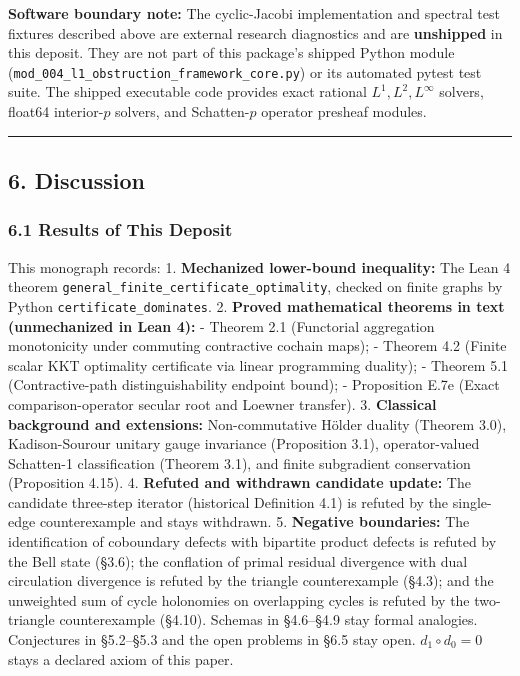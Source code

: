 \documentclass[
]{article}
\begin{document}
\textbf{Software boundary note:} The cyclic-Jacobi implementation and spectral test fixtures described above are external research diagnostics and are \textbf{unshipped} in this deposit. They are not part of this package's shipped Python module (\texttt{mod\_004\_l1\_obstruction\_framework\_core.py}) or its automated pytest test suite. The shipped executable code provides exact rational \(L^1, L^2, L^\infty\) solvers, float64 interior-\(p\) solvers, and Schatten-\(p\) operator presheaf modules.

\begin{center}\rule{0.5\linewidth}{0.5pt}\end{center}

\subsection{6. Discussion}\label{discussion}

\subsubsection{6.1 Results of This Deposit}\label{results-of-this-deposit}

This monograph records:
1. \textbf{Mechanized lower-bound inequality:} The Lean 4 theorem \texttt{general\_finite\_certificate\_optimality}, checked on finite graphs by Python \texttt{certificate\_dominates}.
2. \textbf{Proved mathematical theorems in text (unmechanized in Lean 4):}
- Theorem 2.1 (Functorial aggregation monotonicity under commuting contractive cochain maps);
- Theorem 4.2 (Finite scalar KKT optimality certificate via linear programming duality);
- Theorem 5.1 (Contractive-path distinguishability endpoint bound);
- Proposition E.7e (Exact comparison-operator secular root and Loewner transfer).
3. \textbf{Classical background and extensions:} Non-commutative Hölder duality (Theorem 3.0), Kadison-Sourour unitary gauge invariance (Proposition 3.1), operator-valued Schatten-1 classification (Theorem 3.1), and finite subgradient conservation (Proposition 4.15).
4. \textbf{Refuted and withdrawn candidate update:} The candidate three-step iterator (historical Definition 4.1) is refuted by the single-edge counterexample and stays withdrawn.
5. \textbf{Negative boundaries:} The identification of coboundary defects with bipartite product defects is refuted by the Bell state (§3.6); the conflation of primal residual divergence with dual circulation divergence is refuted by the triangle counterexample (§4.3); and the unweighted sum of cycle holonomies on overlapping cycles is refuted by the two-triangle counterexample (§4.10). Schemas in §4.6--§4.9 stay formal analogies. Conjectures in §5.2--§5.3 and the open problems in §6.5 stay open. \(d_1\circ d_0=0\) stays a declared axiom of this paper.
\end{document}
